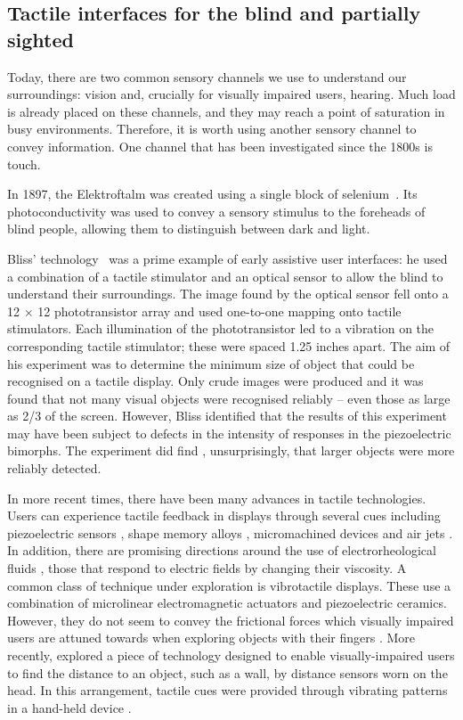 \subsection{Tactile interfaces for the blind and partially sighted}

Today, there are two common sensory channels we use to understand our surroundings: vision and, crucially for visually impaired users, hearing. Much load is already placed on these channels, and they may reach a point of saturation in busy environments. Therefore, it is worth using another sensory channel to convey information. One channel that has been investigated since the 1800s is touch. 

In 1897, the Elektroftalm was created using a single block of selenium~\citep{chekhchoukh2011vision}. Its photoconductivity was used to convey a sensory stimulus to the foreheads of blind people, allowing them to distinguish between dark and light. 

Bliss' technology~\citep{bliss1970optical} was a prime example of early assistive user interfaces: he used a combination of a tactile stimulator and an optical sensor to allow the blind to understand their surroundings. The image found by the optical sensor fell onto a 12 $\times$ 12 phototransistor array and used one-to-one mapping onto tactile stimulators. Each illumination of the phototransistor led to a vibration on the corresponding tactile stimulator; these were spaced 1.25 inches apart. The aim of his experiment was to determine the minimum size of object that could be recognised on a tactile display.  Only crude images were produced and it was found that not many visual objects were recognised reliably -- even those as large as 2/3 of the screen.  However, Bliss identified that the results of this experiment may have been subject to defects in the intensity of responses in the piezoelectric bimorphs.  The experiment did find , unsurprisingly, that larger objects were more reliably detected.


In more recent times, there have been many advances in tactile technologies. Users can experience tactile feedback in displays through several cues including piezoelectric sensors \citep{pasquero2003stress}, shape memory alloys \citep{vidal2003thermopneumatic}, micromachined devices \cite{lee2005micromachined} and air jets \citep{asamura1998selectively}. In addition, there are promising directions around the use of electrorheological fluids \citep{pasquero2003stress}, those that respond to electric fields by changing their viscosity. A common class of technique under exploration is vibrotactile displays. These use a combination of microlinear electromagnetic actuators and piezoelectric ceramics. However, they do not seem to convey the frictional forces which visually impaired users are attuned towards when exploring objects with their fingers \citep{hafez2007tactile}.  More recently, \citet{hartcher2015perception} explored a piece of technology designed to enable visually-impaired users to find the distance to an object, such as a wall, by distance sensors worn on the head. In this arrangement, tactile cues were provided through vibrating patterns in a hand-held device \citep{hartcher2015perception}.  

